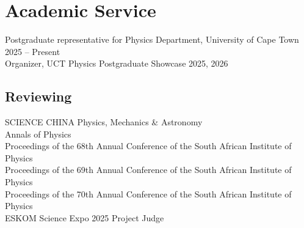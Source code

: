 \documentclass[11pt,letter,sans]{moderncv}
\begin{document}
\section{Academic Service}
      Postgraduate representative for Physics Department, University of Cape Town
    \hfill 2025 -- Present \\
      Organizer, UCT Physics Postgraduate Showcase
    \hfill 2025, 2026 \\

\subsection{Reviewing}
SCIENCE CHINA Physics, Mechanics \& Astronomy \\
Annals of Physics \\
Proceedings of the 68th Annual Conference of the South African Institute of Physics \\
Proceedings of the 69th Annual Conference of the South African Institute of Physics \\
Proceedings of the 70th Annual Conference of the South African Institute of Physics \\
ESKOM Science Expo 2025 Project Judge \\


\end{document}
